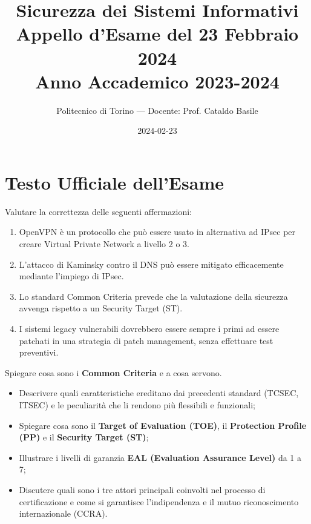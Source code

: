 \documentclass[11pt,a4paper]{article}
\begin{document}
\title{\textbf{Sicurezza dei Sistemi Informativi} \\ \large Appello d'Esame del 23 Febbraio 2024 \\ \small Anno Accademico 2023-2024}
\author{Politecnico di Torino --- Docente: Prof. Cataldo Basile}
\date{2024-02-23}
\maketitle


\section{Testo Ufficiale dell'Esame}

\begin{questionbox}
Valutare la correttezza delle seguenti affermazioni:
\begin{enumerate}[label=\alph*.]
    \item OpenVPN \`e un protocollo che pu\`o essere usato in alternativa ad IPsec per creare Virtual Private Network a livello 2 o 3.
    \item L'attacco di Kaminsky contro il DNS pu\`o essere mitigato efficacemente mediante l'impiego di IPsec.
    \item Lo standard Common Criteria prevede che la valutazione della sicurezza avvenga rispetto a un Security Target (ST).
    \item I sistemi legacy vulnerabili dovrebbero essere sempre i primi ad essere patchati in una strategia di patch management, senza effettuare test preventivi.
\end{enumerate}
\end{questionbox}

\begin{questionbox}
Spiegare cosa sono i \textbf{Common Criteria} e a cosa servono.
\begin{itemize}
    \item Descrivere quali caratteristiche ereditano dai precedenti standard (TCSEC, ITSEC) e le peculiarit\`a che li rendono pi\`u flessibili e funzionali;
    \item Spiegare cosa sono il \textbf{Target of Evaluation (TOE)}, il \textbf{Protection Profile (PP)} e il \textbf{Security Target (ST)};
    \item Illustrare i livelli di garanzia \textbf{EAL (Evaluation Assurance Level)} da 1 a 7;
    \item Discutere quali sono i tre attori principali coinvolti nel processo di certificazione e come si garantisce l'indipendenza e il mutuo riconoscimento internazionale (CCRA).
\end{itemize}
\end{questionbox}
\end{document}
